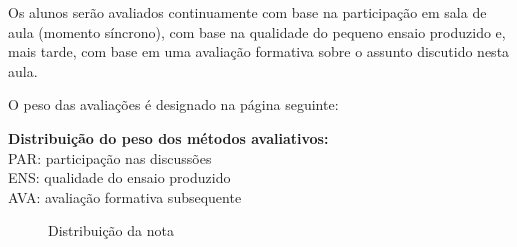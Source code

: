 \documentclass[
	article,			%
	12pt,				%
	twoside,			%
	a4paper,			%
	english,			%
	brazil,				%
	sumario=tradicional
]{plano}
\begin{document}


Os alunos serão avaliados continuamente com base na participação em sala de aula (momento síncrono), com base na qualidade do pequeno ensaio produzido e, mais tarde, com base em uma avaliação formativa sobre o assunto discutido nesta aula.

O peso das avaliações é designado na página seguinte:



\vspace{1.5cm}
\newpage
\noindent \textbf{Distribuição do peso dos métodos avaliativos:}\\
PAR: participação nas discussões\\
ENS: qualidade do ensaio produzido\\
AVA: avaliação formativa subsequente

\begin{figure}[htbp]
\centering
{}
\caption{Distribuição da nota}
\end{figure}

\end{document}
